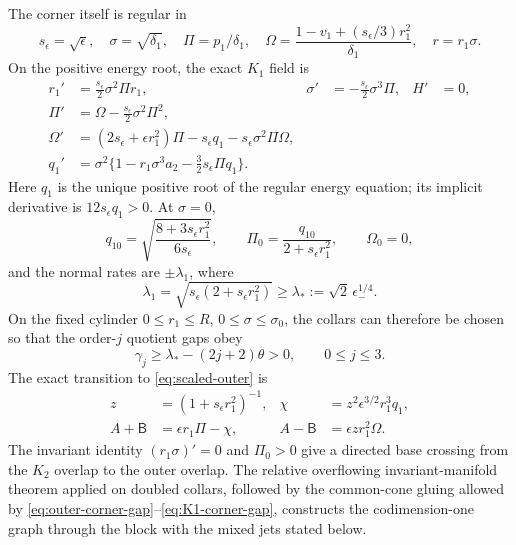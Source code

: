 \documentclass[11pt,reqno]{amsart}
\numberwithin{equation}{section}
\theoremstyle{definition}
\theoremstyle{remark}
\begin{document}
The corner itself is regular in
\begin{equation}\label{eq:resolved-K1-vars}
 s_\epsilon=\sqrt\epsilon,\quad \sigma=\sqrt{\delta_1},\quad
 \Pi=p_1/\delta_1,\quad
 \Omega=\frac{1-v_1+(s_\epsilon/3)r_1^2}{\delta_1},\quad
 r=r_1\sigma .
\end{equation}
On the positive energy root, the exact $K_1$ field is
\begin{equation}\label{eq:resolved-K1-field}
 \begin{aligned}
 r_1'&=\tfrac{s_\epsilon}{2}\sigma^2\Pi r_1,&
 \sigma'&=-\tfrac{s_\epsilon}{2}\sigma^3\Pi,& H'&=0,\\
 \Pi'&=\Omega-\tfrac{s_\epsilon}{2}\sigma^2\Pi^2,\\
 \Omega'&=(2s_\epsilon+\epsilon r_1^2)\Pi-s_\epsilon q_1
              -s_\epsilon\sigma^2\Pi\Omega,\\
 q_1'&=\sigma^2\{1-r_1\sigma^3a_2-\tfrac32s_\epsilon\Pi q_1\}.
 \end{aligned}
\end{equation}
Here $q_1$ is the unique positive root of the regular energy equation;
its implicit derivative is $12s_\epsilon q_1>0$.  At $\sigma=0$,
\[
 q_{10}=\sqrt{\frac{8+3s_\epsilon r_1^2}{6s_\epsilon}},\qquad
 \Pi_0=\frac{q_{10}}{2+s_\epsilon r_1^2},\qquad \Omega_0=0,
\]
and the normal rates are
$\pm\lambda_1$, where
\[
 \lambda_1=\sqrt{s_\epsilon(2+s_\epsilon r_1^2)}
 \ge\lambda_*:=\sqrt2\,\epsilon_-^{1/4}.
\]
On the fixed cylinder
$0\le r_1\le R$, $0\le\sigma\le\sigma_0$, the collars can therefore be
chosen so that the order-$j$ quotient gaps obey
\begin{equation}\label{eq:K1-corner-gap}
 \gamma_j\ge\lambda_*-(2j+2)\theta>0,\qquad 0\le j\le3.
\end{equation}
The exact transition to \eqref{eq:scaled-outer} is
\begin{equation}\label{eq:K1-outer}
 \begin{aligned}
 z&=(1+s_\epsilon r_1^2)^{-1},&
 \chi&=z^2\epsilon^{3/2}r_1^3q_1,\\
 A+\mathsf B&=\epsilon r_1\Pi-\chi,&
 A-\mathsf B&=\epsilon z r_1^2\Omega .
 \end{aligned}
\end{equation}
The invariant identity $(r_1\sigma)'=0$ and $\Pi_0>0$ give a directed
base crossing from the $K_2$ overlap to the outer overlap.  The relative
overflowing invariant-manifold theorem applied on doubled collars, followed
by the common-cone gluing allowed by
\eqref{eq:outer-corner-gap}--\eqref{eq:K1-corner-gap}, constructs the
codimension-one graph through the block with the mixed jets stated below.
\end{document}
